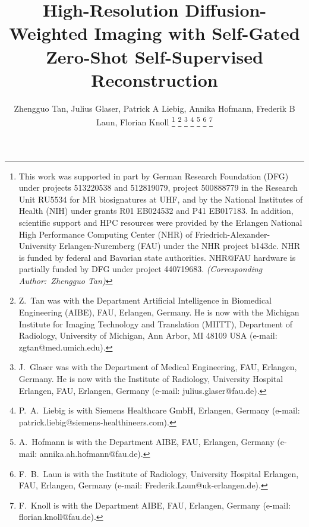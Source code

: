 \documentclass[journal,twoside,web]{ieeecolor}
\begin{document}
	\title{High-Resolution Diffusion-Weighted Imaging with Self-Gated Zero-Shot Self-Supervised Reconstruction}

	\author{Zhengguo Tan, Julius Glaser, Patrick A Liebig, Annika Hofmann, Frederik B Laun, Florian Knoll
		\thanks{This work was supported in part by
			German Research Foundation (DFG)
			under projects 513220538 and 512819079,
			project 500888779 in the Research Unit RU5534
			for MR biosignatures at UHF,
			and by the National Institutes of Health (NIH)
			under grants R01 EB024532 and P41 EB017183.
			In addition, scientific support and HPC resources
			were provided by
			the Erlangen National High Performance Computing Center (NHR)
			of Friedrich-Alexander-University Erlangen-Nuremberg (FAU)
			under the NHR project b143dc.
			NHR is funded by federal and Bavarian state authorities.
			NHR@FAU hardware is partially funded by
			DFG under project 440719683. \textit{(Corresponding Author:~Zhengguo Tan)}}
		\thanks{Z.~Tan was with the Department
			Artificial Intelligence in Biomedical Engineering (AIBE),
			FAU, Erlangen, Germany.
			He is now with
			the Michigan Institute for Imaging Technology and Translation
			(MIITT),
			Department of Radiology,
			University of Michigan, Ann Arbor, MI 48109 USA
			(e-mail: zgtan@med.umich.edu).}
		\thanks{J.~Glaser was with the Department of Medical Engineering,
			FAU, Erlangen, Germany.
			He is now with the Institute of Radiology,
			University Hospital Erlangen,
			FAU, Erlangen, Germany
			(e-mail: julius.glaser@fau.de).}
		\thanks{P.~A.~Liebig is with Siemens Healthcare GmbH, Erlangen, Germany
			(e-mail: patrick.liebig@siemens-healthineers.com).}
		\thanks{A.~Hofmann is with the Department AIBE,
			FAU, Erlangen, Germany
			(e-mail: annika.ah.hofmann@fau.de).}
		\thanks{F.~B.~Laun is with the Institute of Radiology,
			University Hospital Erlangen,
			FAU, Erlangen, Germany
			(e-mail: Frederik.Laun@uk-erlangen.de).}
		\thanks{F.~Knoll is with the Department AIBE,
			FAU, Erlangen, Germany
			(e-mail: florian.knoll@fau.de).}
	}

	\maketitle
\end{document}
